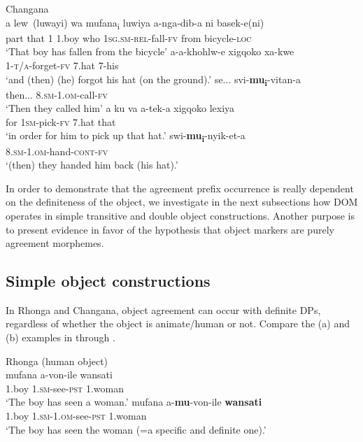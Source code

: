 \documentclass[output=paper]{langsci/langscibook}
\begin{document}
\ea\label{ex:nguna:17}
{Changana}\\
\ea\label{ex:nguna:17a}
\gll a         lew~(luwayi)  wa    mufana\textup{\textsubscript{i}}   luwiya    a-nga-dib-a             ni          basek-e(ni)\\
     part    that                 1      1.boy       who       \textsc{1sg.sm-rel}-fall-\textsc{fv}  from     bicycle-\textsc{loc}\\
\glt ‘That boy has fallen from the bicycle’
\ex\label{ex:nguna:17b} 
\gll a-a-khohlw-e               xigqoko          xa-kwe\\
     1-\textsc{t/a}-forget-\textsc{fv}           7.hat                7-his\\
\glt ‘and (then) (he) forgot his hat (on the ground).’
\ex\label{ex:nguna:17c}
\gll se...         svi-\textbf{mu}\textbf{\textup{\textsubscript{i}}}-vitan-a\\
     then...     8.\textsc{sm-1.om}-call-\textsc{fv}\\
\glt ‘Then they called him’
\ex\label{ex:nguna:17d}
\gll a ku va       a-tek-a              xigqoko       lexiya\\
     for             1\textsc{sm}-pick-\textsc{fv}      7.hat             that\\
\glt ‘in order for him to pick up that hat.’
\ex\label{ex:nguna:17e}
\gll swi-\textbf{mu}\textbf{\textup{\textsubscript{i}}}-nyik-et-a\\
     8.\textsc{sm}-1.\textsc{om}-hand-\textsc{cont}-\textsc{fv}\\
\glt ‘(then) they handed him back (his hat).’
\z
\z

{In order to demonstrate that the agreement prefix occurrence is really dependent on the definiteness of the object, we investigate in the next subsections how DOM operates in simple transitive and double object constructions. Another purpose is to present evidence in favor of the hypothesis that object markers are purely agreement morphemes.}
\subsection{Simple object constructions}

In Rhonga and Changana, object agreement can occur with definite DPs, regardless of whether the object is animate/human or not. Compare the (a) and (b) examples in  through .


\ea\label{ex:nguna:18}
\ea
{Rhonga (human object)}\\
\gll mufana         a-von-ile                  wansati\\
     1.boy           1.\textsc{sm}-see-\textsc{pst}            1.woman\\
\glt ‘The boy has seen a woman.’
\ex\label{ex:nguna: }
\gll mufana    a-\textbf{mu}-von-ile             \textbf{wansati}\\
     1.boy     1\textsc{.sm-1.om}-see-\textsc{pst}     1.woman\\
\glt ‘The boy has seen the woman (=a specific and definite one).’
\z
\z
\end{document}
